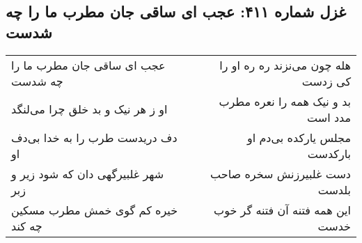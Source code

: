 \begin{center}
\section*{غزل شماره ۴۱۱: عجب ای ساقی جان مطرب ما را چه شدست}
\label{sec:0411}
\begin{longtable}{l p{0.5cm} r}
عجب ای ساقی جان مطرب ما را چه شدست
&&
هله چون می‌نزند ره ره او را کی زدست
\\
او ز هر نیک و بد خلق چرا می‌لنگد
&&
بد و نیک همه را نعره مطرب مدد است
\\
دف دریدست طرب را به خدا بی‌دف او
&&
مجلس یارکده بی‌دم او بارکدست
\\
شهر غلبیرگهی دان که شود زیر و زبر
&&
دست غلبیرزنش سخره صاحب بلدست
\\
خیره کم گوی خمش مطرب مسکین چه کند
&&
این همه فتنه آن فتنه گر خوب خدست
\\
\end{longtable}
\end{center}
